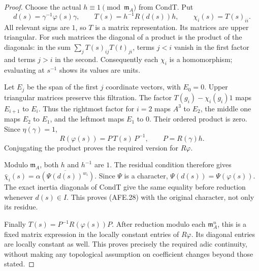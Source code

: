 \begin{proof}
Choose the actual \(h\equiv1\pmod{\mathfrak m_A}\)
from CondT.  Put
\[
 d(s)=\gamma^{-1}\varphi(s)\gamma,\qquad
 T(s)=h^{-1}R(d(s))h,\qquad \chi_i(s)=T(s)_{ii}.
 \]
All relevant signs are \(1\), so \(T\) is a matrix
representation.  Its matrices are upper triangular.
For such matrices the diagonal of a product is the
product of the diagonals: in the sum
\(\sum_j T(s)_{ij}T(t)_{ji}\), terms \(j<i\)
vanish in the first factor and terms \(j>i\)
in the second.  Consequently each \(\chi_i\)
is a homomorphism; evaluating at \(s^{-1}\)
shows its values are units.

Let \(E_j\) be the span of the first \(j\) coordinate
vectors, with \(E_0=0\).
Upper triangular matrices preserve this filtration.
The factor \(T(g_i)-\chi_i(g_i)1\) maps
\(E_{i+1}\) to \(E_i\).
Thus the rightmost factor for \(i=2\) maps \(A^3\)
to \(E_2\), the middle one maps \(E_2\) to \(E_1\),
and the leftmost maps \(E_1\) to \(0\).
Their ordered product is zero.
Since \(\eta(\gamma)=1\),
\[
 R(\varphi(s))=P\,T(s)\,P^{-1},\qquad P=R(\gamma)h.
 \]
Conjugating the product proves the required version
for \(R\varphi\).

Modulo \(\mathfrak m_A\), both \(h\) and \(h^{-1}\)
are \(1\).
The residual condition therefore gives
\(\bar\chi_i(s)=
 \overline{\alpha(\Psi(d(s))^{w_i})}\).
Since \(\Psi\) is a character,
\(\Psi(d(s))=\Psi(\varphi(s))\).
The exact inertia diagonals of CondT give the same
equality before reduction whenever \(d(s)\in I\).
This proves (AFE.28) with the original character,
not only its residue.

Finally
\(T(s)=P^{-1}R(\varphi(s))P\).
After reduction modulo each \(\mathfrak m_A^n\),
this is a fixed matrix expression in the locally
constant entries of \(R\varphi\).
Its diagonal entries are locally constant as well.
This proves precisely the required adic continuity,
without making any topological assumption on
coefficient changes beyond those stated.
\end{proof}

